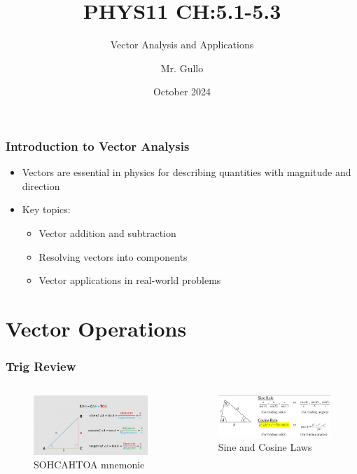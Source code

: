 \documentclass{beamer}
\title[ Vector Analysis]{PHYS11 CH:5.1-5.3}
\subtitle{Vector Analysis and Applications }
\author[Mr. Gullo]{Mr. Gullo}
\date[Oct 2024]{October 2024}
\begin{document}
\frame{\titlepage}

\begin{frame}
\frametitle{Introduction to Vector Analysis}
\begin{itemize}
    \item Vectors are essential in physics for describing quantities with magnitude and direction
    \item Key topics:
    \begin{itemize}
        \item Vector addition and subtraction
        \item Resolving vectors into components
        \item Vector applications in real-world problems
    \end{itemize}
\end{itemize}
\end{frame}

\section{Vector Operations}

\begin{frame}
\frametitle{Trig Review}
\begin{columns}[T] %
    \begin{figure}
        \centering
        \includegraphics[width=\linewidth]{phys11-math-trigonometry-sohcahtoa.png}
        \caption{SOHCAHTOA mnemonic}
    \end{figure}

    \begin{figure}
        \centering
        \includegraphics[width=\linewidth]{phys11-math-sine-cosine-laws.png}
        \caption{Sine and Cosine Laws}
    \end{figure}
\end{columns}
\end{frame}
\end{document}
